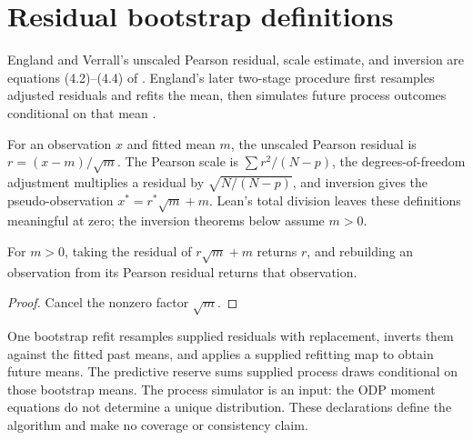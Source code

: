 \section{Residual bootstrap definitions}

England and Verrall's unscaled Pearson residual, scale estimate, and inversion are equations
(4.2)--(4.4) of \cite{EnglandVerrall1999}. England's later two-stage procedure first resamples
adjusted residuals and refits the mean, then simulates future process outcomes conditional on
that mean \cite[Sections 2--3]{England2002}.

\begin{definition}\label{def:odpBootstrapResidual}\leanok
For an observation $x$ and fitted mean $m$, the unscaled Pearson residual is
$r=(x-m)/\sqrt m$. The Pearson scale is $\sum r^2/(N-p)$, the degrees-of-freedom
adjustment multiplies a residual by $\sqrt{N/(N-p)}$, and inversion gives the pseudo-observation
$x^*=r^*\sqrt m+m$. Lean's total division leaves these definitions meaningful at zero; the
inversion theorems below assume $m>0$.
\end{definition}

\begin{lemma}\label{lem:odpBootstrapInverse}\leanok
{}
For $m>0$, taking the residual of $r\sqrt m+m$ returns $r$, and rebuilding an observation
from its Pearson residual returns that observation.
\end{lemma}
\begin{proof}\leanok Cancel the nonzero factor $\sqrt m$. \end{proof}

\begin{definition}\label{def:odpBootstrap}\leanok
One bootstrap refit resamples supplied residuals with replacement, inverts them against the
fitted past means, and applies a supplied refitting map to obtain future means. The predictive
reserve sums supplied process draws conditional on those bootstrap means.
The process simulator is an input: the ODP moment equations do not determine a unique
distribution. These declarations define the algorithm and make no coverage or consistency claim.
\end{definition}

